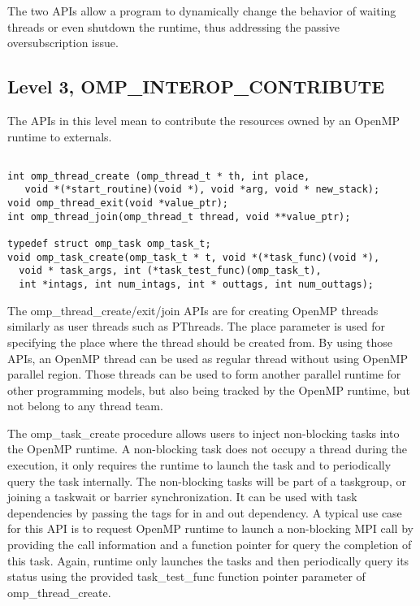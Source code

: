 {The two APIs allow a program to dynamically change the behavior of waiting threads or even shutdown the runtime, thus addressing the passive
oversubscription issue. 


\subsection{Level 3, OMP\_INTEROP\_CONTRIBUTE}
The APIs in this level mean to contribute the resources owned by an OpenMP runtime to externals. 

\lstset{basicstyle=\sffamily\small,language=c, numbersep=1pt}
\begin{lstlisting}[frame=single]  % Start your code-block

int omp_thread_create (omp_thread_t * th, int place,  
   void *(*start_routine)(void *), void *arg, void * new_stack);
void omp_thread_exit(void *value_ptr);
int omp_thread_join(omp_thread_t thread, void **value_ptr);

typedef struct omp_task omp_task_t;
void omp_task_create(omp_task_t * t, void *(*task_func)(void *), 
  void * task_args, int (*task_test_func)(omp_task_t), 
  int *intags, int num_intags, int * outtags, int num_outtags);
\end{lstlisting}
The {\sf omp\_thread\_create/exit/join} APIs are for creating OpenMP threads similarly as user threads such 
as PThreads. The {\sf place} parameter is used for specifying the place where the thread should be created from.  
By using those APIs, an OpenMP thread
can be used as regular thread without using OpenMP parallel region. Those threads can be used to form another parallel runtime for other programming
models, but also being tracked by the OpenMP runtime, but not belong to any thread team. 

The {\sf omp\_task\_create} procedure allows users to inject non-blocking tasks into the OpenMP runtime. A non-blocking task does not occupy
a thread during the execution, it only requires the runtime to launch the task and to periodically query the task internally. The non-blocking
tasks will be part of a {\sf taskgroup}, or joining a {\sf taskwait} or {\sf barrier} synchronization. It can be used with task dependencies by 
passing the tags for in and out dependency. A typical use case for this API is to request OpenMP runtime to launch a non-blocking MPI call by providing the call information and a function pointer for query the completion of this task. Again, runtime only launches the tasks and then periodically
query its status using the provided {\sf task\_test\_func} function pointer parameter of {\sf omp\_thread\_create}.

}
